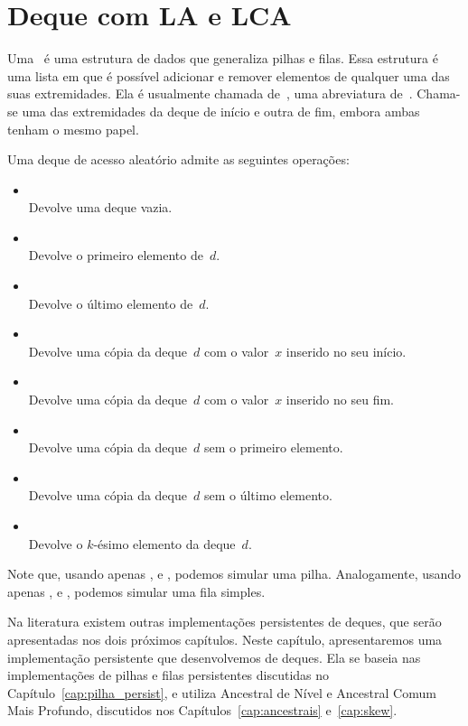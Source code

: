 \documentclass[main.tex]{subfiles}
\begin{document}
\chapter{Deque com LA e LCA} \label{cap:deque1_persist}

Uma~ é uma estrutura de dados que generaliza pilhas e filas. Essa estrutura é uma lista em que é possível adicionar e remover elementos de qualquer uma das suas extremidades. Ela é usualmente chamada de~, uma abreviatura de~.
Chama-se uma das extremidades da deque de início e outra de fim, embora ambas tenham o mesmo papel.

Uma deque de acesso aleatório admite as seguintes operações:

\begin{itemize}
	\item {}
	      \\ Devolve uma deque vazia.
	\item {}
	      \\ Devolve o primeiro elemento de~$d$.
	\item {}
	      \\ Devolve o último elemento de~$d$.
	\item {}
	      \\ Devolve uma cópia da deque~$d$ com o valor~$x$ inserido no seu início.
	\item {}
	      \\ Devolve uma cópia da deque~$d$ com o valor~$x$ inserido no seu fim.
	\item {}
	      \\ Devolve uma cópia da deque~$d$ sem o primeiro elemento.
	\item {}
	      \\ Devolve uma cópia da deque~$d$ sem o último elemento.
	\item {}
	      \\ Devolve o $k$-ésimo elemento da deque~$d$.
\end{itemize}

Note que, usando apenas ,  e , podemos simular uma pilha. Analogamente, usando apenas ,  e , podemos simular uma fila simples.

Na literatura existem outras implementações persistentes de deques, que serão apresentadas nos dois próximos capítulos. Neste capítulo, apresentaremos uma implementação persistente que desenvolvemos de deques. Ela se baseia nas implementações de pilhas e filas persistentes discutidas no Capítulo~\ref{cap:pilha_persist}, e utiliza Ancestral de Nível e Ancestral Comum Mais Profundo, discutidos nos Capítulos~\ref{cap:ancestrais} e~\ref{cap:skew}.
\end{document}
